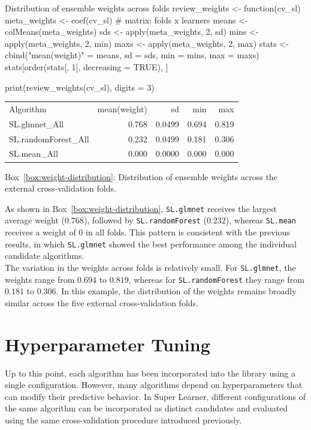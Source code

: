 \documentclass[12pt]{article}
\newcommand{\routputcaption}[2]{%
    \par\smallskip
    \begin{center}
        Box~\ref{#1}: #2
    \end{center}
}
\begin{document}
\begin{rcode}[label={code:review-weights}]{Distribution of ensemble weights across folds}
	review_weights <- function(cv_sl) {
		meta_weights <- coef(cv_sl)              # matrix: folds x learners
		means <- colMeans(meta_weights)
		sds   <- apply(meta_weights, 2, sd)
		mins  <- apply(meta_weights, 2, min)
		maxs  <- apply(meta_weights, 2, max)
		stats <- cbind("mean(weight)" = means, sd = sds, min = mins, max = maxs)
		stats[order(stats[, 1], decreasing = TRUE), ]
	}
	
	print(review_weights(cv_sl), digits = 3)
\end{rcode}

\begin{routputboxref}[label={box:weight-distribution}]
	\ttfamily
	\centering
	\begin{tabular}{lrrrr}
		Algorithm & mean(weight) & sd & min & max \\
		SL.glmnet\_All       & 0.768 & 0.0499 & 0.694 & 0.819 \\
		SL.randomForest\_All & 0.232 & 0.0499 & 0.181 & 0.306 \\
		SL.mean\_All         & 0.000 & 0.0000 & 0.000 & 0.000 \\
	\end{tabular}
\end{routputboxref}

\routputcaption{box:weight-distribution}
{Distribution of ensemble weights across the external cross-validation folds.}

As shown in Box~\ref{box:weight-distribution}, \texttt{SL.glmnet} receives the largest average weight ($0.768$), followed by \texttt{SL.randomForest} ($0.232$), whereas \texttt{SL.mean} receives a weight of $0$ in all folds. This pattern is consistent with the previous results, in which \texttt{SL.glmnet} showed the best performance among the individual candidate algorithms. \\
The variation in the weights across folds is relatively small. For \texttt{SL.glmnet}, the weights range from $0.694$ to $0.819$, whereas for \texttt{SL.randomForest} they range from $0.181$ to $0.306$. In this example, the distribution of the weights remains broadly similar across the five external cross-validation folds.

\section{Hyperparameter Tuning}

Up to this point, each algorithm has been incorporated into the library using a single configuration. However, many algorithms depend on hyperparameters that can modify their predictive behavior. In Super Learner, different configurations of the same algorithm can be incorporated as distinct candidates and evaluated using the same cross-validation procedure introduced previously.
\end{document}
